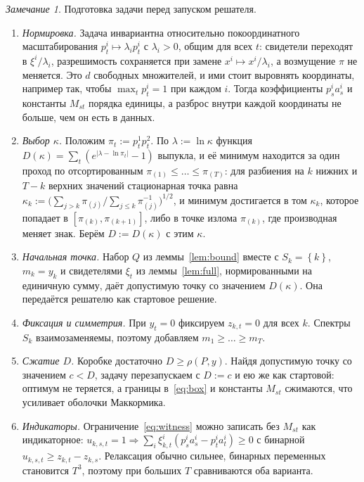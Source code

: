 \documentclass[a4paper,11pt]{article}
\theoremstyle{plain}
\theoremstyle{definition}
\theoremstyle{remark}
\newtheorem*{remark}{Замечание}
\newcommand{\abs}[1]{\left\lvert #1 \right\rvert}
\newcommand{\set}[1]{\left\{ #1 \right\}}
\begin{document}
\begin{remark}
    Подготовка задачи перед запуском решателя.
    \begin{enumerate}
        \item \emph{Нормировка.} Задача инвариантна относительно покоординатного масштабирования $p^i_t\mapsto\lambda_ip^i_t$ с $\lambda_i>0$, общим для всех $t$: свидетели переходят в $\xi^i/\lambda_i$, разрешимость сохраняется при замене $x^i\mapsto x^i/\lambda_i$, а возмущение $\pi$ не меняется. Это $d$ свободных множителей, и ими стоит выровнять координаты, например так, чтобы $\max_tp^i_t=1$ при каждом $i$. Тогда коэффициенты $p^i_sa^i_s$ и константы $M_{st}$ порядка единицы, а разброс внутри каждой координаты не больше, чем он есть в данных.
        \item \emph{Выбор $\kappa$.} Положим $\pi_t:=p^1_tp^2_t$. По $\lambda:=\ln\kappa$ функция $D(\kappa)=\sum_t(e^{\abs{\lambda-\ln\pi_t}}-1)$ выпукла, и её минимум находится за один проход по отсортированным $\pi_{(1)}\le\dots\le\pi_{(T)}$: для разбиения на $k$ нижних и $T-k$ верхних значений стационарная точка равна $\kappa_k:=\bigl(\sum_{j>k}\pi_{(j)}\big/\sum_{j\le k}\pi_{(j)}^{-1}\bigr)^{1/2}$, и минимум достигается в том $\kappa_k$, которое попадает в $[\pi_{(k)},\pi_{(k+1)}]$, либо в точке излома $\pi_{(k)}$, где производная меняет знак. Берём $D:=D(\kappa)$ с этим $\kappa$.
        \item \emph{Начальная точка.} Набор $Q$ из леммы~\ref{lem:bound} вместе с $S_k=\set k$, $m_k=y_k$ и свидетелями $\xi_t$ из леммы~\ref{lem:full}, нормированными на единичную сумму, даёт допустимую точку со значением $D(\kappa)$. Она передаётся решателю как стартовое решение.
        \item \emph{Фиксация и симметрия.} При $y_t=0$ фиксируем $z_{k,t}=0$ для всех $k$. Спектры $S_k$ взаимозаменяемы, поэтому добавляем $m_1\ge\dots\ge m_T$.
        \item \emph{Сжатие $D$.} Коробке достаточно $D\ge\rho(P,y)$. Найдя допустимую точку со значением $c<D$, задачу перезапускаем с $D:=c$ и ею же как стартовой: оптимум не теряется, а границы в~\eqref{eq:box} и константы $M_{st}$ сжимаются, что усиливает оболочки Маккормика.
        \item \emph{Индикаторы.} Ограничение~\eqref{eq:witness} можно записать без $M_{st}$ как индикаторное: $u_{k,s,t}=1\Rightarrow\sum_i\xi^i_{k,t}(p^i_sa^i_s-p^i_ta^i_t)\ge0$ с бинарной $u_{k,s,t}\ge z_{k,t}-z_{k,s}$. Релаксация обычно сильнее, бинарных переменных становится $T^3$, поэтому при больших $T$ сравниваются оба варианта.
    \end{enumerate}
\end{remark}
\end{document}
